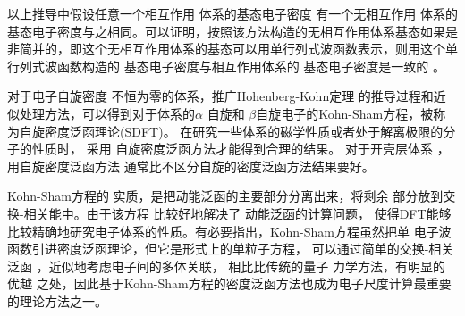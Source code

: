 以上推导中假设任意一个相互作用%
{体系的基态电}子密度%
{有一个}无相互作用%
{体系的基态电}子密度{与之相同}。可以证明\cite{PNAS76-6062_1979,IJQC24-243_1983}，按照该方法构造的无相互作用体系基态如果是非简并的，即这个无相互作用体系的基态可以用单行列式波函数表示，则用这个单行列式波函数构造的%
{基态电}子密度与相互作用体系的%
{基态电}子密度是一致的%
。

对于{电子}自旋{密度}%
{不恒为零的体系，推广}Hohenberg-Kohn定理%
{的推导过程和近似处理方法，可以得到对于体系的}$\alpha$%
自旋和%
{$\beta$自旋}电子的{\textrm{Kohn-Sham}方程，被称为自旋密度泛函理论\textrm{(SDFT)}。}%
{在}研究一些体系的磁学性质或者处于解离极限的分子的性质{时}，%
采用%
自旋密度泛函方法才能得到合理的结果{。}%
对于开壳层体系%
，用自旋密度泛函方法%
通常比不{区}分自旋的密度泛函方法结果要好。%

Kohn-Sham方程的%
实质，是把动能泛函的主要部分分离出来，将剩余%
部分放到交换-相关能中。由于该方程%
{比较好地}解决了%
动能泛函的{计算}问题，%
使得DFT能够比较精确地研究电子体系的性质。有必要指出，Kohn-Sham方程虽然把单%
{电}子波函数引进密度泛函理论，但它是{形式上}的单粒子方程，%
可以通过简单的交换-相关泛函%
{，近似地考虑}电子间的多体关联，%
{相比}比传统的量子%
{力}学方法，有明显的%
优越%
{之处}，{因此}基于Kohn-Sham方程的密度泛函方法也成为电子尺度计算最重要的{理论}方法之一。

